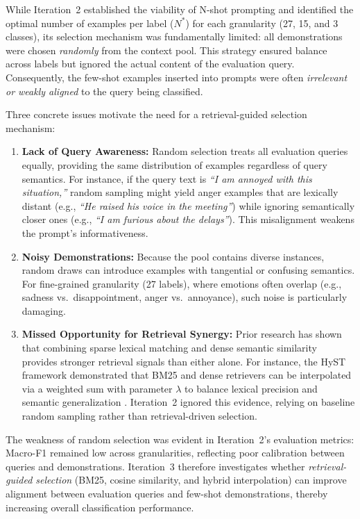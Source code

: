 While Iteration~2 established the viability of N-shot prompting and identified the optimal number of examples per label ($N^\ast$) for each granularity (27, 15, and 3 classes), its selection mechanism was fundamentally limited: all demonstrations were chosen \emph{randomly} from the context pool. This strategy ensured balance across labels but ignored the actual content of the evaluation query. Consequently, the few-shot examples inserted into prompts were often \emph{irrelevant or weakly aligned} to the query being classified.  

Three concrete issues motivate the need for a retrieval-guided selection mechanism:  

\begin{enumerate}
  \item \textbf{Lack of Query Awareness:}  
  Random selection treats all evaluation queries equally, providing the same distribution of examples regardless of query semantics. For instance, if the query text is \emph{``I am annoyed with this situation,''} random sampling might yield anger examples that are lexically distant (e.g., \emph{``He raised his voice in the meeting''}) while ignoring semantically closer ones (e.g., \emph{``I am furious about the delays''}). This misalignment weakens the prompt’s informativeness.  

  \item \textbf{Noisy Demonstrations:}  
  Because the pool contains diverse instances, random draws can introduce examples with tangential or confusing semantics. For fine-grained granularity (27 labels), where emotions often overlap (e.g., sadness vs.\ disappointment, anger vs.\ annoyance), such noise is particularly damaging.  

  \item \textbf{Missed Opportunity for Retrieval Synergy:}  
  Prior research has shown that combining sparse lexical matching and dense semantic similarity provides stronger retrieval signals than either alone. For instance, the HyST framework demonstrated that BM25 and dense retrievers can be interpolated via a weighted sum with parameter $\lambda$ to balance lexical precision and semantic generalization \cite{hyst2025}. Iteration~2 ignored this evidence, relying on baseline random sampling rather than retrieval-driven selection.  
\end{enumerate}

The weakness of random selection was evident in Iteration~2’s evaluation metrics: Macro-F1 remained low across granularities, reflecting poor calibration between queries and demonstrations. Iteration~3 therefore investigates whether \emph{retrieval-guided selection} (BM25, cosine similarity, and hybrid interpolation) can improve alignment between evaluation queries and few-shot demonstrations, thereby increasing overall classification performance.


